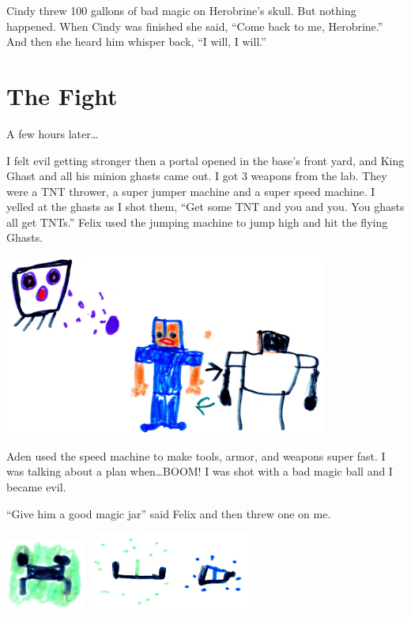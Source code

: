 \documentclass[12pt,oneside]{krantz}
\begin{document}
Cindy threw 100 gallons of bad magic on Herobrine's skull. But nothing
happened. When Cindy was finished she said, ``Come back to me,
Herobrine.'' And then she heard him whisper back, ``I will, I will.''

\hypertarget{the-fight}{%
\chapter{The Fight}\label{the-fight}}

A few hours later\ldots{}

I felt evil getting stronger then a portal opened in the base's front
yard, and King Ghast and all his minion ghasts came out. I got 3 weapons
from the lab. They were a TNT thrower, a super jumper machine and a
super speed machine. I yelled at the ghasts as I shot them, ``Get some
TNT and you and you. You ghasts all get TNTs.'' Felix used the jumping
machine to jump high and hit the flying Ghasts.

\includegraphics[width=4.16667in,height=\textheight]{img/king-ghast/07-attack.jpg}

Aden used the speed machine to make tools, armor, and weapons super
fast. I was talking about a plan when\ldots{}BOOM! I was shot with a bad
magic ball and I became evil.

``Give him a good magic jar'' said Felix and then threw one on me.

\includegraphics[width=1.04167in,height=\textheight]{img/king-ghast/06-creeper.jpg}
\includegraphics[width=2.08333in,height=\textheight]{img/king-ghast/06-dots.jpg}
\end{document}
